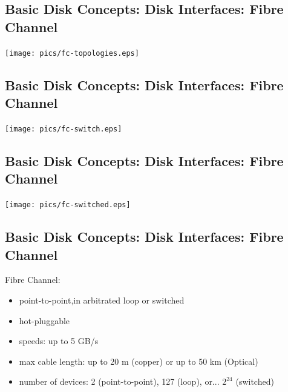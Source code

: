\documentclass[xga]{xdvislides}
\begin{document}
\subsection{Basic Disk Concepts: Disk Interfaces: Fibre Channel}
\vfill
	\begin{center}
		\texttt{[image: pics/fc-topologies.eps]} \\
	\end{center}
\vfill

\subsection{Basic Disk Concepts: Disk Interfaces: Fibre Channel}
\vfill
	\begin{center}
		\texttt{[image: pics/fc-switch.eps]} \\
	\end{center}
\vfill

\subsection{Basic Disk Concepts: Disk Interfaces: Fibre Channel}
\vfill
	\begin{center}
		\texttt{[image: pics/fc-switched.eps]} \\
	\end{center}
\vfill

\subsection{Basic Disk Concepts: Disk Interfaces: Fibre Channel}
Fibre Channel:
\begin{itemize}
	\item point-to-point,in arbitrated loop or switched
	\item hot-pluggable
	\item speeds: up to 5 GB/s
	\item max cable length: up to 20 m (copper) or up to 50 km (Optical)
	\item number of devices: 2 (point-to-point), 127 (loop), or... $2^{24}$ (switched)
\end{itemize}

\end{document}

